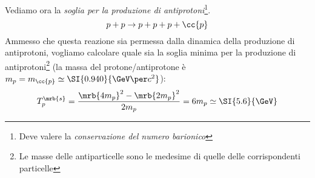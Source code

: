 \begin{example}
  Vediamo ora la \textit{soglia per la produzione di antiprotoni}\footnote{
    Deve valere la \textit{conservazione del numero barionico}
  }.
	\begin{equation}
		p + p \rightarrow p + p + p + \cc{p}
	\end{equation}
	Ammesso che questa reazione sia permessa dalla dinamica della produzione di
	antiprotoni, vogliamo calcolare quale sia la soglia minima per la produzione
	di antiprotoni\footnote{
		Le masse delle antiparticelle sono le medesime di quelle delle
		corrispondenti particelle
	} (la massa del protone/antiprotone è $m _{p} = m _{\cc{p}} \simeq
	\SI{0.940}{\GeV \per c^2}$):
	\begin{equation}
		T _{p} ^{\mrb{s}} = \frac{\mrb{4 m_p}^{2} - \mrb{2 m_p}^{2}}{2 m_p} = 6 m_p
		\simeq \SI{5.6}{\GeV}
	\end{equation}
\end{example}

